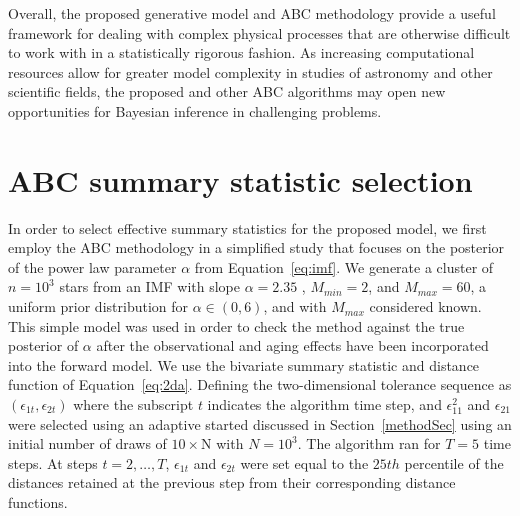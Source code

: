 \documentclass[12pt]{article}
\begin{document}
Overall, the proposed generative model and ABC methodology provide a useful framework for dealing with complex physical processes that are otherwise difficult to work with in a statistically rigorous fashion.
As increasing computational resources allow for greater model complexity in studies of astronomy and other scientific fields, the proposed and other ABC algorithms may open new opportunities for Bayesian inference in challenging problems. 

\appendix
\section{ABC summary statistic selection} \label{app:summary}
In order to select effective summary statistics for the proposed model, we first employ the ABC methodology in a simplified study that focuses on the posterior of the power law parameter $\alpha$ from Equation~\eqref{eq:imf}.  We generate a cluster of $n = 10^3$ stars from an IMF with slope $\alpha = 2.35$  \citep{salpeter55}, $M_{min} = 2$, and $M_{max} = 60$,  a uniform prior distribution for $\alpha \in (0, 6)$, and with $M_{max}$ considered known.  This simple model was used in order to check the method against the true posterior of $\alpha$ after the observational and aging effects have been incorporated into the forward model.  We use the bivariate summary statistic and distance function of Equation~\eqref{eq:2da}.  Defining the two-dimensional tolerance sequence as $(\epsilon_{1t}, \epsilon_{2t})$ where the subscript $t$ indicates the algorithm time step, and  $\epsilon_{11}^2$ and $\epsilon_{21}$ were selected using an adaptive started discussed in Section~\ref{methodSec} using an initial number of draws of $10\times$N with $N = 10^3$.  The algorithm ran for $T = 5$ time steps.
At steps $t = 2,\ldots,T$, $\epsilon_{1t}$ and $\epsilon_{2t}$ were set equal to the $25th$ percentile of the distances retained at the previous step from their corresponding distance functions.
\end{document}
